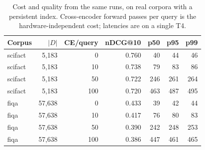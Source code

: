\begin{table}[t]
\centering
\small
\caption{Cost and quality from the same runs, on real corpora with a persistent index. Cross-encoder forward passes per query is the hardware-independent cost; latencies are on a single T4.}
\label{tab:cost}
\begin{tabular}{lrrrrrr}
\toprule
Corpus & $|D|$ & CE/query & nDCG@10 & p50 & p95 & p99 \\
\midrule
scifact & 5,183 & 0 & 0.760 & 40 & 44 & 46 \\
scifact & 5,183 & 10 & 0.738 & 79 & 83 & 86 \\
scifact & 5,183 & 50 & 0.722 & 246 & 261 & 264 \\
scifact & 5,183 & 100 & 0.720 & 463 & 487 & 495 \\
fiqa & 57,638 & 0 & 0.433 & 39 & 42 & 44 \\
fiqa & 57,638 & 10 & 0.417 & 76 & 80 & 83 \\
fiqa & 57,638 & 50 & 0.390 & 242 & 248 & 253 \\
fiqa & 57,638 & 100 & 0.386 & 447 & 461 & 465 \\
\bottomrule
\end{tabular}
\end{table}
